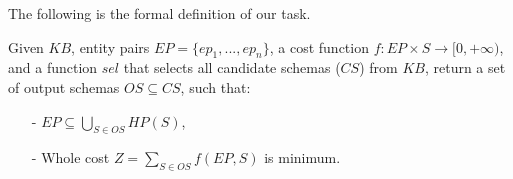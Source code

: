 The following is the formal definition of our task.

\begin{definition}
\label{def:pp}
Given $KB$, entity pairs $EP = \{ep_1, ..., ep_n\}$,
a cost function $f: EP \times S \rightarrow [0, +\infty)$,
and a function $sel$ that selects all candidate schemas ($CS$) from $KB$,
return a set of output schemas $OS \subseteq CS$, such that:
\begin{itemize}
    \item[-] $EP \subseteq \bigcup_{S \in OS} HP(S)$,
    \item[-] Whole cost $Z = \sum\nolimits_{S \in OS} f(EP, S)$ is minimum.
\end{itemize}
%
\end{definition}


%
%


